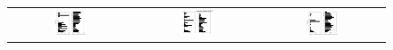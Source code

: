 \documentclass[12pt]{article}
\begin{document}
\begin{figure}[!htb]
\begin{tabular}{ccc}
     \includegraphics[width=0.3\textwidth]{fig/ccf/ccf7} & \includegraphics[width=0.3\textwidth]{fig/ccf/ccf8} & \includegraphics[width=0.3\textwidth]{fig/ccf/ccf9} 
 \end{tabular}
\end{figure}

\FloatBarrier
\end{document}
